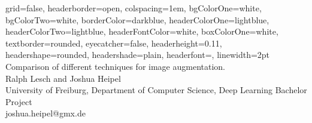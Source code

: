 \documentclass[a0paper,portrait]{baposter}
\begin{document}

\begin{poster}
{
grid=false,
headerborder=open, %
colspacing=1em, %
bgColorOne=white, %
bgColorTwo=white, %
borderColor=darkblue, %
headerColorOne=lightblue, %
headerColorTwo=lightblue, %
headerFontColor=white, %
boxColorOne=white, %
textborder=rounded, %
eyecatcher=false, %
headerheight=0.11\textheight, %
headershape=rounded, %
headershade=plain,
headerfont=\Large\textsf, %
linewidth=2pt %
}
{}
%
%
{
\textsf %
{Comparison of different techniques for image augmentation.
}
} %
{\sf\vspace{0.5em}\\
Ralph Lesch and Joshua Heipel
\vspace{0.1em}\\
\small{University of Freiburg, Department of Computer Science, Deep Learning Bachelor Project
\vspace{0.2em}\\
joshua.heipel@gmx.de}
}



\end{poster}
\end{document}
